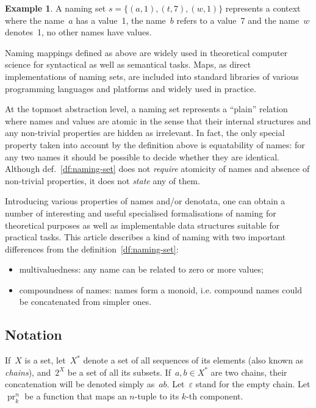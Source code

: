 \documentclass{article}
\theoremstyle{definition}
\newtheorem{Ex}{Example}
\newcommand{\proj}[2]{\operatorname{pr}^{#1}_{#2}}
\begin{document}
\begin{Ex}\label{ex:naming-set}
A naming set $s = \{ (a, 1), (t, 7), (w, 1) \}$ represents a context where
the name~$a$ has a value~1, the name~$b$ refers to a value~7 and the name~$w$
denotes~1, no other names have values.
\end{Ex}

Naming mappings defined as above are widely used in theoretical computer
science for syntactical as well as semantical tasks.
Maps, as direct
implementations of naming sets, are included into standard libraries of various
programming languages and platforms and widely used in practice.

At the topmost abstraction level, a naming set represents a ``plain'' relation
where names and values are atomic in the sense that their internal structures
and any non-trivial properties are hidden as irrelevant.  In fact, the only
special property taken into account by the definition above is equatability of
names: for any two names it should be possible to decide whether they are
identical.  Although def.~\ref{df:naming-set} does not \emph{require} atomicity
of names and absence of non-trivial properties, it does not \emph{state} any of
them.

Introducing various properties of names and/or denotata, one can obtain a
number of interesting and useful specialised formalisations of naming for
theoretical purposes as well as implementable data structures suitable for
practical tasks. This article describes a kind of naming with
two important differences from the definition~\ref{df:naming-set}:
\begin{itemize}
\item multivaluedness: any name can be related to zero or more values;
\item compoundness of names: names form a monoid, i.e. compound names could
be concatenated from simpler ones.
\end{itemize}

\subsection*{Notation}

If~$X$ is a set, let~$X^\ast$ denote a set of all sequences of its elements
(also known as \emph{chains}), and~$2^X$ be a set of all its subsets.
If~$a,b\in X^\ast$ are two chains, their concatenation will be denoted simply
as~$ab$. Let~$\varepsilon$ stand for the empty chain.
Let $\proj{n}{k}$ be a function that maps an $n$-tuple to its $k$-th component.
\end{document}
